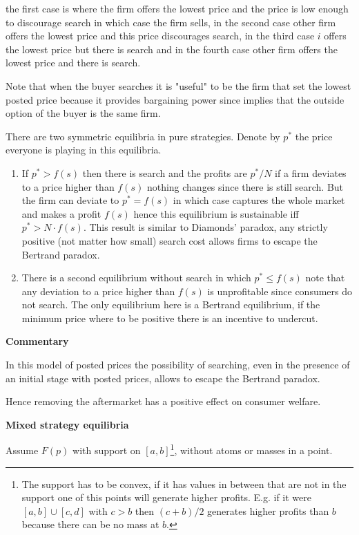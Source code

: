 \documentclass[12pt]{article}
\theoremstyle{plain}
\theoremstyle{plain}
\begin{document}
the first case is where the  firm offers the lowest price and the price is low enough to discourage search in which case the firm sells, in the second case other firm offers the lowest price and this price discourages search, in the third 
case $i$ offers the lowest price but there is search and in the fourth case other firm offers the lowest price and there is search. 

Note that when the buyer searches it is "useful" to be the firm that set the lowest posted price because it provides bargaining power since implies that the outside option of the buyer is the same firm.  

There are two symmetric equilibria in pure strategies. Denote by $p^*$ the price everyone is playing in this equilibria. 
\begin{enumerate}
    \item If $p^* >f(s)$ then there is search and the profits are $p^*/N$ if a firm deviates to a price higher than $f(s)$ nothing changes since there is still search. But the firm can deviate to $p^*=f(s)$ in which case captures the whole market and makes a profit $f(s)$ hence this equilibrium is sustainable iff $p^*> N \cdot f(s)$. This result is similar to Diamonds' paradox, any strictly positive (not matter how small) search cost allows firms to escape the Bertrand paradox. 
    
    \item There is a second equilibrium without search in which $p^*\leq f(s)$ note that any deviation to a price higher than $f(s)$ is unprofitable since consumers do not search. The only equilibrium here is a Bertrand equilibrium, if the minimum price where to be positive there is an incentive to undercut. 
\end{enumerate}

\textbf{Commentary}

In this model of posted prices the possibility of searching, even in the presence of an initial stage with posted prices,  allows to escape the Bertrand paradox. 

Hence removing the aftermarket has a positive effect on consumer welfare. 


\newpage

\textbf{Mixed strategy equilibria }


Assume $F(p)$ with support on $[a,b]$\footnote{The support has to be convex, if it has values in between that are not in the support one of this points will generate higher profits. E.g. if it were $[a,b] \cup [c,d]$ with $c>b$ then $(c+b)/2$ generates higher profits than $b$ because there can be no mass at $b$.}, without atoms or masses in a point.
\end{document}

